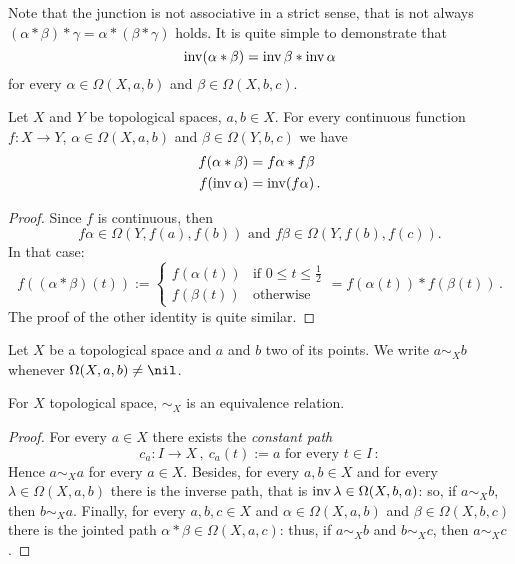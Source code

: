 Note that the junction is not associative in a strict sense, that is not always \((\alpha \ast \beta) \ast \gamma = \alpha \ast (\beta \ast \gamma)\) holds. It is quite simple to demonstrate that
\[\operatorname{inv} (\alpha \ast \beta) = \operatorname{inv}\beta \ast \operatorname{inv}\alpha\]
for every \(\alpha \in \Omega(X, a, b)\) and \(\beta \in \Omega(X, b, c)\).

\begin{lemma}
Let \(X\) and \(Y\) be topological spaces, \(a, b \in X\). For every continuous function \(f :  X \to Y\), \(\alpha \in \Omega(X, a, b)\) and \(\beta \in \Omega(Y, b, c)\) we have
\begin{align*}
f(\alpha \ast \beta) &= f\alpha \ast f\beta \\
f(\operatorname{inv} \alpha)       &= \operatorname{inv} (f \alpha)\,. 
\end{align*}
\end{lemma}

\begin{proof}
Since \(f\) is continuous, then
\[f \alpha \in \Omega(Y, f(a), f(b)) \text{ and } f \beta \in \Omega(Y, f(b), f(c)).\]
In that case:
\[f((\alpha \ast \beta)(t)) := \begin{cases} f(\alpha(t)) & \text{if } 0 \le t \le \frac12 \\ f(\beta(t)) & \text{otherwise} \end{cases} = f(\alpha(t)) \ast f(\beta(t))\,.\]
The proof of the other identity is quite similar.
\end{proof}

\begin{definition}
Let \(X\) be a topological space and \(a\) and \(b\) two of its points. We write \(a \sim_X b\) whenever \(\Omega(X, a, b) \ne \nil\).
\end{definition}

\begin{proposition}
For \(X\) topological space, \(\sim_X\) is an equivalence relation.
\end{proposition}

\begin{proof}
For every \(a \in X\) there exists the {\em constant path}
\[c_a : I \to X\,, \ c_a(t) := a \text{ for every } t \in I\,:\]
Hence \(a \sim_X a\) for every \(a \in X\). Besides, for every \(a, b \in X\) and for every \(\lambda \in \Omega(X, a, b)\) there is the inverse path, that is \(\operatorname{inv} \lambda \in \Omega(X, b, a)\): so, if \(a \sim_X b\), then \(b \sim_X a\). Finally, for every \(a, b, c \in X\) and \(\alpha \in \Omega(X, a, b)\) and \(\beta \in \Omega(X, b, c)\) there is the jointed path \(\alpha \ast \beta \in \Omega(X, a, c)\): thus, if \(a \sim_X b\) and \(b \sim_X c\), then \(a \sim_X c\).
\end{proof}

